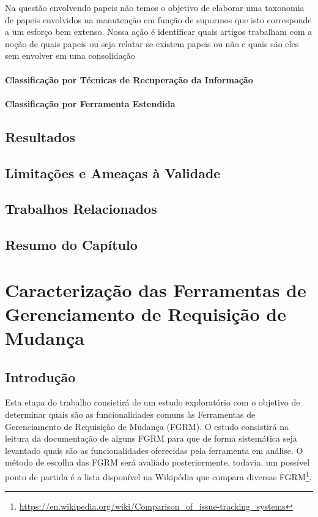 \documentclass[msc]{ppgccufmg} %
\begin{document}
Na questão envolvendo papeis não temos o objetivo de elaborar uma taxonomia de papeis envolvidos na manutenção em função de supormos que isto corresponde a um esforço bem extenso. Nossa ação é identificar quais artigos trabalham com a noção de
quais papeis ou seja relatar se existem papeis ou não e quais são eles sem envolver em uma consolidação

\subsubsection{Classificação por Técnicas de Recuperação da Informação}
\label{subsubsec:map-esaquema-tecnicas-ir}


\subsubsection{Classificação por Ferramenta Estendida}
\label{subsubsec:map-esquema-ferramenta}


\section{Resultados}
\label{sec:resutaldos}

\section{Limitações e Ameaças à Validade}

\section{Trabalhos Relacionados}

\section{Resumo do Capítulo}

\chapter{Caracterização das Ferramentas de Gerenciamento de Requisição de Mudança}
\label{ch:caracterizacao}


\section{Introdução}

Esta etapa do trabalho consistirá de um estudo exploratório com o objetivo de determinar quais são as funcionalidades comuns às Ferramentas de Gerenciamento de Requisição de Mudança (FGRM). O estudo consistirá na leitura da documentação de alguns FGRM para que de forma sistemática seja levantado quais são as funcionalidades oferecidas pela ferramenta em análise. O método de escolha das FGRM será avaliado posteriormente, todavia, um possível ponto de partida é a lista disponível na Wikipédia que compara diversas FGRM\footnote{\url{https://en.wikipedia.org/wiki/Comparison_of_issue-tracking_systems}}.
\end{document}
